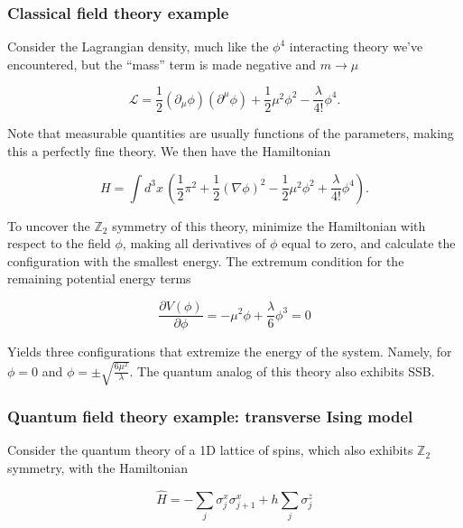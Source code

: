 \subsubsection*{Classical field theory example}

\noindent Consider the Lagrangian density, much like the $\phi^4$ interacting theory we've encountered, but the ``mass'' term is made negative and $m \rightarrow \mu$

\begin{equation}
\mathcal{L} = \frac{1}{2} (\partial_\mu \phi)(\partial^\mu \phi) + \frac{1}{2} \mu^2 \phi^2 - \frac{\lambda}{4!} \phi^4.
\end{equation}

\noindent Note that measurable quantities are usually functions of the parameters, making this a perfectly fine theory. We then have the Hamiltonian

\begin{equation}
H = \int d^3 x \, \left( \frac{1}{2} \pi^2 + \frac{1}{2} (\nabla \phi)^2 - \frac{1}{2} \mu^2 \phi^2 + \frac{\lambda}{4!} \phi^4 \right).
\end{equation}

\noindent To uncover the $\mathbb{Z}_2$ symmetry of this theory, minimize the Hamiltonian with respect to the field $\phi$, making all derivatives of $\phi$ equal to zero, and calculate the configuration with the smallest energy. The extremum condition for the remaining potential energy terms

\begin{equation}
\frac{\partial V(\phi)}{\partial \phi} = -\mu^2 \phi + \frac{\lambda}{6} \phi^3 = 0
\end{equation}

\noindent Yields three configurations that extremize the energy of the system. Namely, for $\phi = 0$ and $\phi = \pm \sqrt{\frac{6 \mu^2}{\lambda}}$. The quantum analog of this theory also exhibits SSB.

\subsubsection*{Quantum field theory example: transverse Ising model}

\noindent Consider the quantum theory of a 1D lattice of spins, which also exhibits $\mathbb{Z}_2$ symmetry, with the Hamiltonian

\begin{equation}
\hat{H} = - \sum_{j} \sigma_j^x \sigma_{j+1}^x + h \sum_j \sigma_j^z
\end{equation}

